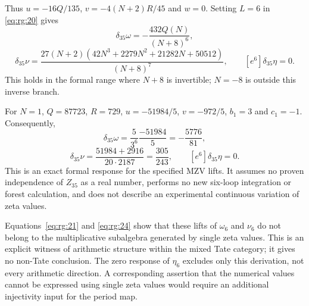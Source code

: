 \documentclass[11pt,a4paper,oneside]{article}
\theoremstyle{plain}
\theoremstyle{definition}
\theoremstyle{remark}
\numberwithin{equation}{section}
\begin{document}
Thus $u=-16Q/135$, $v=-4(N+2)R/45$ and $w=0$. Setting $L=6$ in \eqref{eq:rg:20} gives
\begin{equation}
[e^6]\delta_{35}\omega=-\frac{432Q(N)}{(N+8)^6},
\end{equation}
\begin{equation}
[e^6]\delta_{35}\nu=
 \frac{27(N+2)(42N^3+2279N^2+21282N+50512)}{(N+8)^7},
 \qquad [e^6]\delta_{35}\eta=0.                    \label{eq:rg:23}
\end{equation}
This holds in the formal range where $N+8$ is invertible; $N=-8$ is outside this inverse branch.

For $N=1$, $Q=87723$, $R=729$, $u=-51984/5$, $v=-972/5$, $b_1=3$ and $c_1=-1$. Consequently,
\begin{equation}
[e^6]\delta_{35}\omega=\frac5{3^6}\frac{-51984}5
      =-\frac{5776}{81},
\end{equation}
\begin{equation}
[e^6]\delta_{35}\nu
   =\frac{51984+2916}{20\cdot2187}
   =\frac{305}{243},\qquad [e^6]\delta_{35}\eta=0.   \label{eq:rg:24}
\end{equation}
This is an exact formal response for the specified MZV lifts. It assumes no proven independence of $Z_{35}$ as a real number, performs no new six-loop integration or forest calculation, and does not describe an experimental continuous variation of zeta values.

Equations~\eqref{eq:rg:21} and \eqref{eq:rg:24} show that these lifts of $\omega_6$ and $\nu_6$ do not belong to the multiplicative subalgebra generated by single zeta values. This is an explicit witness of arithmetic structure within the mixed Tate category; it gives no non-Tate conclusion. The zero response of $\eta_6$ excludes only this derivation, not every arithmetic direction. A corresponding assertion that the numerical values cannot be expressed using single zeta values would require an additional injectivity input for the period map.
\end{document}
